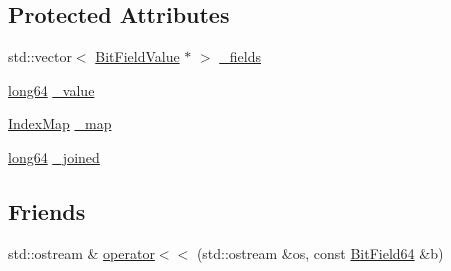 \subsection*{Protected Attributes}
\begin{DoxyCompactItemize}
\item 
std::vector$<$ \hyperlink{class_d_d4hep_1_1_d_d_segmentation_1_1_bit_field_value}{BitFieldValue} $\ast$ $>$ \hyperlink{class_d_d4hep_1_1_d_d_segmentation_1_1_bit_field64_a1a8739ee82ff112b34aee61feb39cda3}{\_\-fields}
\item 
\hyperlink{namespace_d_d4hep_ac2a70e722b33dc7ddaa20db8954ac836}{long64} \hyperlink{class_d_d4hep_1_1_d_d_segmentation_1_1_bit_field64_a5c784ab1cd7dcd334b3a06cd1ce496f4}{\_\-value}
\item 
\hyperlink{class_d_d4hep_1_1_d_d_segmentation_1_1_bit_field64_a332cc613098802352470f92c7a7c71fd}{IndexMap} \hyperlink{class_d_d4hep_1_1_d_d_segmentation_1_1_bit_field64_a0bf8be0d75f49e529d583f4025a6b23c}{\_\-map}
\item 
\hyperlink{namespace_d_d4hep_ac2a70e722b33dc7ddaa20db8954ac836}{long64} \hyperlink{class_d_d4hep_1_1_d_d_segmentation_1_1_bit_field64_afbef9d9ffa1944254144159c518fc227}{\_\-joined}
\end{DoxyCompactItemize}
\subsection*{Friends}
\begin{DoxyCompactItemize}
\item 
std::ostream \& \hyperlink{class_d_d4hep_1_1_d_d_segmentation_1_1_bit_field64_a6d781e0764c4c38ae618a3431af85e4e}{operator$<$$<$} (std::ostream \&os, const \hyperlink{class_d_d4hep_1_1_d_d_segmentation_1_1_bit_field64}{BitField64} \&b)
\end{DoxyCompactItemize}


